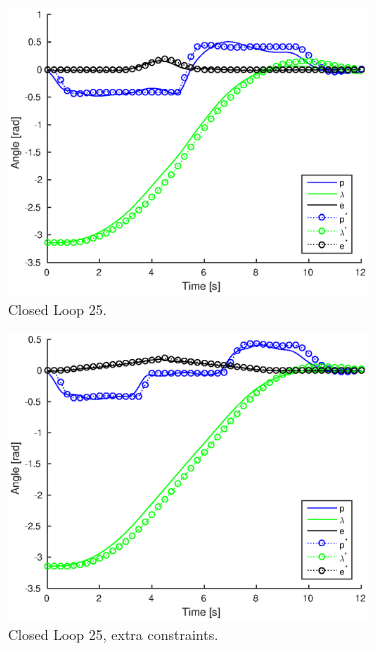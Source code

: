 \begin{figure}[hp]
	\centering
		\includegraphics[width=0.85\textwidth]{figures/4/closedloop25.eps}
	\caption{Closed Loop 25.}
	\label{fig:closedloop25}
\end{figure}

\begin{figure}[hp]
	\centering
		\includegraphics[width=0.85\textwidth]{figures/4/closedloopConstrained25.eps}
	\caption{Closed Loop 25, extra constraints.}
	\label{fig:closedloopConstrained25}
\end{figure}


